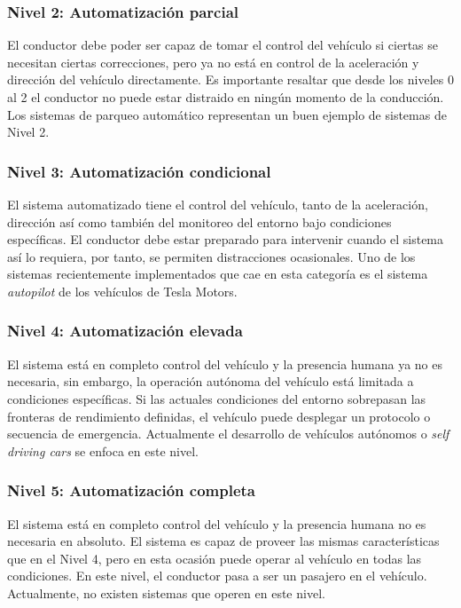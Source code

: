         \subsubsection{Nivel 2: Automatización parcial}
        El conductor debe poder ser capaz de tomar el control del vehículo si ciertas se necesitan ciertas correcciones, pero  
        ya no está en control de la aceleración y dirección del vehículo directamente. Es importante resaltar que desde los
        niveles 0 al 2 el conductor no puede estar distraido en ningún momento de la conducción. Los sistemas de parqueo 
        automático representan un buen ejemplo de sistemas de Nivel 2.
        
        \subsubsection{Nivel 3: Automatización condicional}
        El sistema automatizado tiene el control del vehículo, tanto de la aceleración, dirección así como también del monitoreo 
        del entorno bajo condiciones específicas. El conductor debe estar preparado para intervenir cuando el sistema así lo 
        requiera, por tanto, se permiten distracciones ocasionales. Uno de los sistemas recientemente implementados que cae en esta 
        categoría es el sistema \textit{autopilot} de los vehículos de Tesla Motors. %
        
        \subsubsection{Nivel 4: Automatización elevada}
        El sistema está en completo control del vehículo y la presencia humana ya no es necesaria, sin embargo, la operación autónoma 
        del vehículo está limitada a condiciones específicas. Si las actuales condiciones del entorno sobrepasan las fronteras 
        de rendimiento definidas, el vehículo puede desplegar un protocolo o secuencia de emergencia. Actualmente el desarrollo 
        de vehículos autónomos o \textit{self driving cars} se enfoca en este nivel. 
        
        \subsubsection{Nivel 5: Automatización completa}
        El sistema está en completo control del vehículo y la presencia humana no es necesaria en absoluto. El sistema es capaz 
        de proveer las mismas características que en el Nivel 4, pero en esta ocasión puede operar al vehículo en todas las condiciones.
        En este nivel, el conductor pasa a ser un pasajero en el vehículo. Actualmente, no existen sistemas que operen en este nivel.

